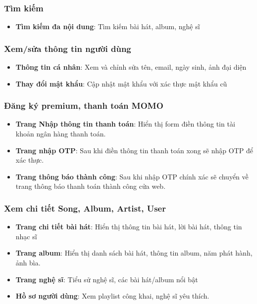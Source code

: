 \documentclass[a4paper,12pt]{article}
\begin{document}
\subsubsection{Tìm kiếm}
\begin{itemize}
    \item \textbf{Tìm kiếm đa nội dung}: Tìm kiếm bài hát, album, nghệ sĩ
\end{itemize}
\subsubsection{Xem/sửa thông tin người dùng}
\begin{itemize}
    \item \textbf{Thông tin cá nhân}: Xem và chỉnh sửa tên, email, ngày sinh, ảnh đại diện
    \item \textbf{Thay đổi mật khẩu}: Cập nhật mật khẩu với xác thực mật khẩu cũ
\end{itemize}
\subsubsection{Đăng ký premium, thanh toán MOMO}
\begin{itemize}
    \item \textbf{Trang Nhập thông tin thanh toán}: Hiển thị form điền thông tin tài khoản ngân hàng thanh toán.
    \item \textbf{Trang nhập OTP}: Sau khi điền thông tin thanh toán xong sẽ nhập OTP để xác thực.
    \item \textbf{Trang thông báo thành công}: Sau khi nhập OTP chính xác sẽ chuyển về trang thông báo thanh toán thành công cửa web.
\end{itemize}
\subsubsection{Xem chi tiết Song, Album, Artist, User}
\begin{itemize}
    \item \textbf{Trang chi tiết bài hát}: Hiển thị thông tin bài hát, lời bài hát, thông tin nhạc sĩ
    \item \textbf{Trang album}: Hiển thị danh sách bài hát, thông tin album, năm phát hành, ảnh bìa.
    \item \textbf{Trang nghệ sĩ}: Tiểu sử nghệ sĩ, các bài hát/album nổi bật
    \item \textbf{Hồ sơ người dùng}: Xem playlist công khai, nghệ sĩ yêu thích.
\end{itemize}
\end{document}
